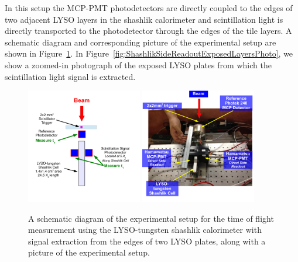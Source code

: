 \documentclass[12pt]{article}
\begin{document}
In this setup the MCP-PMT photodetectors are directly coupled to the edges of two adjacent LYSO layers in the shashlik
calorimeter and scintillation light is directly transported to the photodetector
through the edges of the tile layers. A schematic diagram and corresponding
picture  of the experimental setup are shown in
Figure~\ref{fig:ShashlikSideReadoutSetup}. In
Figure~\ref{fig:ShashlikSideReadoutExposedLayersPhoto}, we show a zoomed-in
photograph of the exposed LYSO plates from which the scintillation light signal
is extracted.

\begin{figure}[H] \centering
\includegraphics[width=0.45\textwidth]{figs/ShashlikSideReadoutSetupSchematic} 
\includegraphics[width=0.45\textwidth]{figs/ShashlikSideReadoutPhotoB} 
\caption{ \small A schematic diagram of the experimental setup for the
time of flight measurement using the LYSO-tungsten shashlik calorimeter
with signal extraction from the edges of two LYSO plates, along
with a picture of the experimental setup. } 
\label{fig:ShashlikSideReadoutSetup}
\end{figure}
\end{document}
